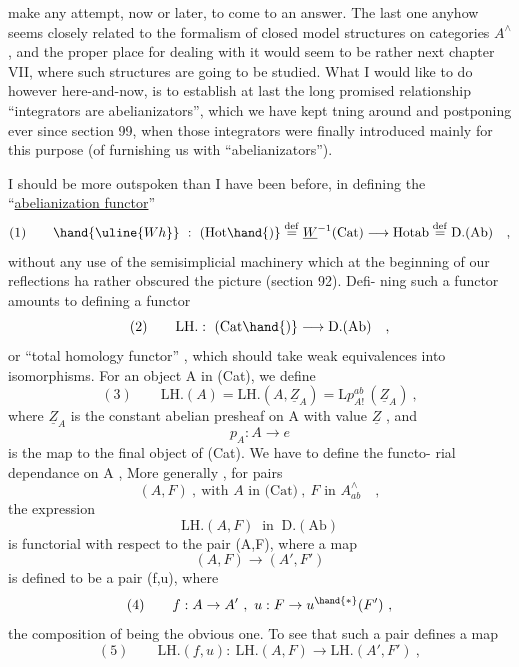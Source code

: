 
make any attempt,  now or later,  to come to an answer.  The last one
anyhow seems closely related to the formalism of closed model structures
on categories $A^{\wedge}$,  and the proper place for dealing with it would seem
to be rather next chapter VII,  where such structures are going to be
 studied.  What I would like to do however here-and-now,  is
to establish at last the long promised relationship ``integrators are
abelianizators'',  which we have kept tning around and postponing
ever since section 99,  when those integrators were finally introduced
mainly for this purpose (of furnishing us with ``abelianizators'').

 I should be more outspoken than I have been before,   in
defining the ``\uline{abelianization functor}'' 
\[ (1) \qquad \hand{\uline{Wh}} \ : \ (\mathrm{Hot}\hand{)} \overset{\mathrm{def}}{=} \underline{W}^{-1}(\mathrm{Cat}) \longrightarrow \mathrm{Hotab} \overset{\mathrm{def}}{=} \mathrm{D.(Ab)} \quad , \]
without any use of the semisimplicial machinery\deleted{,} which\hand{,} at the beginning
of our reflections\hand{,} ha rather obscured the picture\deleted{,} (section 92).  Defi-%
ning such a functor amounts to defining a functor
\[ (2) \qquad \mathrm{LH.} : \ (\mathrm{Cat}\hand{)} \longrightarrow \mathrm{D.(Ab)} \quad , \]
or ``total homology functor'' ,  which should take weak equivalences into
isomorphisms.  For an object A in (Cat),  we define
\[ (3) \qquad \mathrm{LH.}(A) = \mathrm{LH.}(A,\underline{Z}_A) = \mathrm{L}p^{ab}_{A!}\,(\underline{Z}_A) \ , \]
where $\underline{Z}_A$ is the constant abelian presheaf on A with value $\underline{Z}$ ,  and
\[ p_A : A \longrightarrow e \]
is the map to the final object of (Cat).  We have to define the functo-%
rial dependance on A ,  More generally ,  for pairs
\[ (A,F) \ , \ \text{with } A \text{ in (Cat)} \ , \ F \text{ in } A^{\wedge}_{ab} \quad , \]
the expression
\[ \mathrm{LH.}(A,F) \ \text{ in } \ \mathrm{D.(Ab)} \]
is functorial with respect to the pair (A,F),  where a map
\[ (A,F) \longrightarrow (A',F') \]
is defined to be a pair    (f,u),  where
\[ (4) \qquad f: A \to A' \ , \ u: F \to u^{\hand{*}}(F') \ , \]
the composition of   being the obvious  one.  To see that such
a pair  defines a map
\[ (5) \qquad \mathrm{LH.}(f,u): \ \mathrm{LH.}(A,F) \longrightarrow \mathrm{LH.}(A',F') \ , \]

